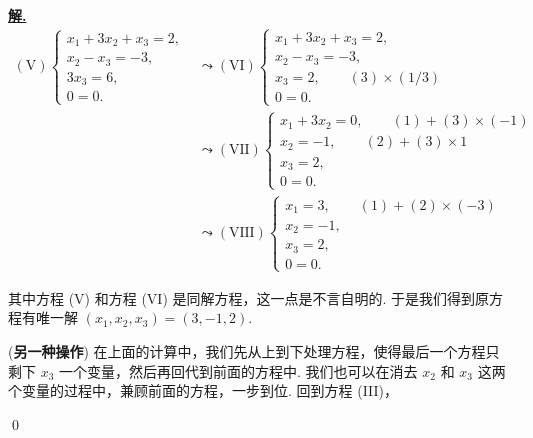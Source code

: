 \documentclass[10pt,openany]{article}
\theoremstyle{thmstyle} %
\theoremstyle{defstyle} %
\theoremstyle{prostyle} %
\newenvironment{solution}{\par\underline{\textbf{解.}} \;\fangsong}{\qed\par}
\begin{document}
\begin{solution}
	 \begin{align*}
		 (\text{V}) \left\{
		\begin{array}{l}
			x_1 + 3x_2 + x_3 = 2, \\
			x_2 - x_3 = -3, \\
			3x_3 = 6, \\
			0 = 0. 
		\end{array}
		\right. &\leadsto (\text{VI}) \left\{
		\begin{array}{l}
			x_1 + 3x_2 + x_3 = 2, \\
			x_2 - x_3 = -3, \\
			x_3 = 2, \qquad (3) \times (1/3) \\
			0 = 0.
		\end{array}
		\right.\\
		&\leadsto (\text{VII}) \left\{
		\begin{array}{l}
			x_1 + 3x_2 = 0, \qquad (1)+(3) \times (-1) \\
			x_2 = -1, \qquad (2)+(3) \times 1\\
			x_3 = 2, \\
			0 = 0.
		\end{array}
		\right.\\
		&\leadsto (\text{VIII}) \left\{
		\begin{array}{l}
			x_1 = 3, \qquad (1)+(2) \times (-3) \\
			x_2 = -1, \\
			x_3 = 2, \\
			0 = 0.
		\end{array}
		\right.
	\end{align*}  
	
	其中方程 (V) 和方程 (VI) 是同解方程，这一点是不言自明的. 于是我们得到原方程有唯一解 \( (x_1,x_2,x_3)=(3,-1,2) \).
	
	(\textbf{另一种操作}) 在上面的计算中，我们先从上到下处理方程，使得最后一个方程只剩下 \( x_3 \) 一个变量，然后再回代到前面的方程中. 我们也可以在消去 \( x_2 \) 和 \( x_3 \) 这两个变量的过程中，兼顾前面的方程，一步到位. 回到方程 (III)，
	

\end{solution}
\end{document}
